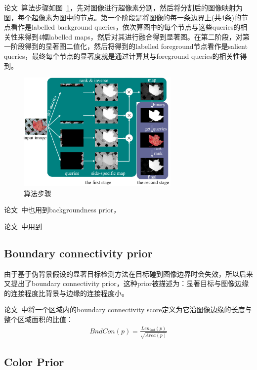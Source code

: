 \documentclass[12pt]{article}
\begin{document}
论文~\cite{yang2013saliency}算法步骤如图~\ref{fig: MR1}，先对图像进行超像素分割，然后将分割后的图像映射为图，每个超像素为图中的节点。第一个阶段是将图像的每一条边界上(共4条)的节点看作是labelled background queries，依次算图中的每个节点与这些queries的相关性来得到4幅labelled maps，然后对其进行融合得到显著图。在第二阶段，对第一阶段得到的显著图二值化，然后将得到的labelled foreground节点看作是salient queries，最终每个节点的显著度就是通过计算其与foreground queries的相关性得到。
\begin{figure}[!ht]
\centering
\includegraphics[width=0.7\textwidth]{MR1.png}
\caption{算法步骤}
\label{fig: MR1}
\end{figure}

论文~\cite{jiang2013saliency}中也用到backgroundness prior，

论文~\cite{lu2014learning}中用到

\subsection{Boundary connectivity prior}

由于基于伪背景假设的显著目标检测方法在目标碰到图像边界时会失效，所以后来又提出了boundary connectivity prior，这种prior被描述为：显著目标与图像边缘的连接程度比背景与边缘的连接程度小。

论文~\cite{zhu2014saliency}中将一个区域内的boundary connectivity score定义为它沿图像边缘的长度与整个区域面积的比值：
\begin{align}
BndCon(p) = \frac{Len_{bnd}(p)}{\sqrt{Area(p)}}
\end{align}

\subsection{Color Prior}
\end{document}
